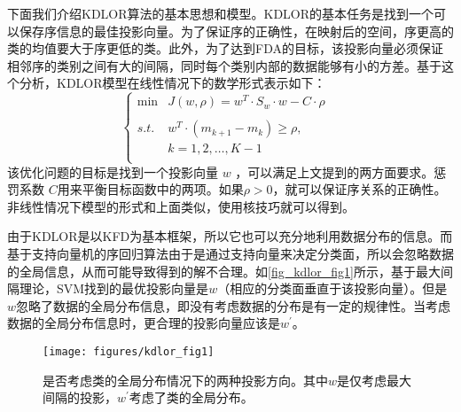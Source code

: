 下面我们介绍KDLOR算法的基本思想和模型。KDLOR的基本任务是找到一个可以保存序信息的最佳投影向量。为了保证序的正确性，在映射后的空间，序更高的类的均值要大于序更低的类。此外，为了达到FDA的目标，该投影向量必须保证相邻序的类别之间有大的间隔，同时每个类别内部的数据能够有小的方差。基于这个分析，KDLOR模型在线性情况下的数学形式表示如下：
\begin{equation}
\label{kdlor}
\left\{\begin{array}{rll} \min & J(w,\rho)=w^{T}\cdot S_{w}\cdot w-C\cdot \rho& \\
\\
s.t. & w^{T}\cdot (m_{k+1}-m_{k})\geq\rho,{} \\
     & k = 1,2,\dots,K-1\\
\end{array}
\right.
\end{equation}
该优化问题的目标是找到一个投影向量 \(w\) ，可以满足上文提到的两方面要求。惩罚系数 \(C\)用来平衡目标函数中的两项。如果\(\rho>0\)，就可以保证序关系的正确性。非线性情况下模型的形式和上面类似，使用核技巧就可以得到。

由于KDLOR是以KFD为基本框架，所以它也可以充分地利用数据分布的信息。而基于支持向量机的序回归算法由于是通过支持向量来决定分类面，所以会忽略数据的全局信息，从而可能导致得到的解不合理\citep{sun2010kernel}。如\autoref{fig_kdlor_fig1}所示，基于最大间隔理论，SVM找到的最优投影向量是\(w\)（相应的分类面垂直于该投影向量）。但是\(w\)忽略了数据的全局分布信息，即没有考虑数据的分布是有一定的规律性。当考虑数据的全局分布信息时，更合理的投影向量应该是\(w^{'}\)。


\begin{figure}[htb]
   \centering
   \texttt{[image: figures/kdlor\_fig1]}
\caption{是否考虑类的全局分布情况下的两种投影方向\citep{sun2010kernel}。其中$w$是仅考虑最大间隔的投影，$w^{'}$考虑了类的全局分布。}
\label{fig_kdlor_fig1}
\end{figure}

